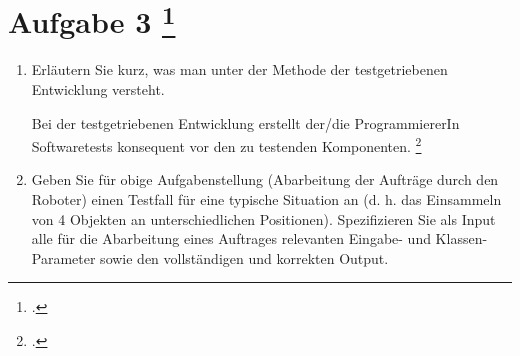 \documentclass{lehramt-informatik-aufgabe}
\begin{document}
\section{Aufgabe 3
\footcite{66116:2019:03}}

\begin{enumerate}

\item Erläutern Sie kurz, was man unter der Methode der testgetriebenen
Entwicklung versteht.

\begin{liAntwort}
Bei der testgetriebenen Entwicklung erstellt der/die ProgrammiererIn
Softwaretests konsequent vor den zu testenden Komponenten.
\footcite{wiki:testgetriebene-entwicklung}
\end{liAntwort}


\item Geben Sie für obige Aufgabenstellung (Abarbeitung der Aufträge
durch den Roboter) einen Testfall für eine typische Situation an (d. h.
das Einsammeln von 4 Objekten an unterschiedlichen Positionen).
Spezifizieren Sie als Input alle für die Abarbeitung eines Auftrages
relevanten Eingabe- und Klassen-Parameter sowie den vollständigen und
korrekten Output.
\end{enumerate}
\end{document}
